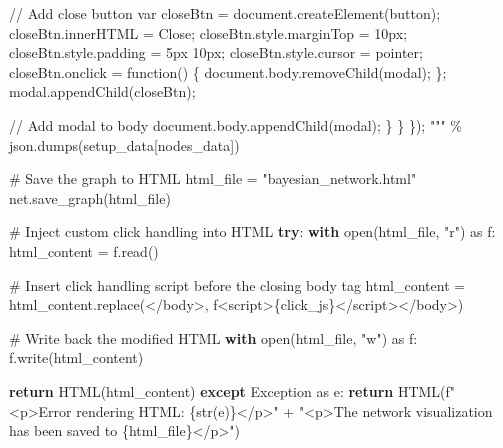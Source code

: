 \documentclass[
  11pt,
  letterpaper,
]{book}
\newenvironment{Shaded}{\begin{snugshade}}{\end{snugshade}}
\newcommand{\BuiltInTok}[1]{\textcolor[rgb]{0.00,0.23,0.31}{#1}}
\newcommand{\CommentTok}[1]{\textcolor[rgb]{0.37,0.37,0.37}{#1}}
\newcommand{\ControlFlowTok}[1]{\textcolor[rgb]{0.00,0.23,0.31}{\textbf{#1}}}
\newcommand{\ImportTok}[1]{\textcolor[rgb]{0.00,0.46,0.62}{#1}}
\newcommand{\NormalTok}[1]{\textcolor[rgb]{0.00,0.23,0.31}{#1}}
\newcommand{\OperatorTok}[1]{\textcolor[rgb]{0.37,0.37,0.37}{#1}}
\newcommand{\PreprocessorTok}[1]{\textcolor[rgb]{0.68,0.00,0.00}{#1}}
\newcommand{\SpecialCharTok}[1]{\textcolor[rgb]{0.37,0.37,0.37}{#1}}
\newcommand{\SpecialStringTok}[1]{\textcolor[rgb]{0.13,0.47,0.30}{#1}}
\newcommand{\StringTok}[1]{\textcolor[rgb]{0.13,0.47,0.30}{#1}}
\begin{document}
\begin{landscape}
\begin{Shaded}
\begin{Highlighting}[]
\StringTok{                // Add close button}
\StringTok{                var closeBtn = document.createElement(\textquotesingle{}button\textquotesingle{});}
\StringTok{                closeBtn.innerHTML = \textquotesingle{}Close\textquotesingle{};}
\StringTok{                closeBtn.style.marginTop = \textquotesingle{}10px\textquotesingle{};}
\StringTok{                closeBtn.style.padding = \textquotesingle{}5px 10px\textquotesingle{};}
\StringTok{                closeBtn.style.cursor = \textquotesingle{}pointer\textquotesingle{};}
\StringTok{                closeBtn.onclick = function() \{}
\StringTok{                    document.body.removeChild(modal);}
\StringTok{                \};}
\StringTok{                modal.appendChild(closeBtn);}

\StringTok{                // Add modal to body}
\StringTok{                document.body.appendChild(modal);}
\StringTok{            \}}
\StringTok{        \}}
\StringTok{    \});}
\StringTok{    """} \OperatorTok{\%}\NormalTok{ json.dumps(setup\_data[}\StringTok{\textquotesingle{}nodes\_data\textquotesingle{}}\NormalTok{])}

    \CommentTok{\# Save the graph to HTML}
\NormalTok{    html\_file }\OperatorTok{=} \StringTok{"bayesian\_network.html"}
\NormalTok{    net.save\_graph(html\_file)}

    \CommentTok{\# Inject custom click handling into HTML}
    \ControlFlowTok{try}\NormalTok{:}
        \ControlFlowTok{with} \BuiltInTok{open}\NormalTok{(html\_file, }\StringTok{"r"}\NormalTok{) }\ImportTok{as}\NormalTok{ f:}
\NormalTok{            html\_content }\OperatorTok{=}\NormalTok{ f.read()}

        \CommentTok{\# Insert click handling script before the closing body tag}
\NormalTok{        html\_content }\OperatorTok{=}\NormalTok{ html\_content.replace(}\StringTok{\textquotesingle{}\textless{}/body\textgreater{}\textquotesingle{}}\NormalTok{, }\SpecialStringTok{f\textquotesingle{}\textless{}script\textgreater{}}\SpecialCharTok{\{}\NormalTok{click\_js}\SpecialCharTok{\}}\SpecialStringTok{\textless{}/script\textgreater{}\textless{}/body\textgreater{}\textquotesingle{}}\NormalTok{)}

        \CommentTok{\# Write back the modified HTML}
        \ControlFlowTok{with} \BuiltInTok{open}\NormalTok{(html\_file, }\StringTok{"w"}\NormalTok{) }\ImportTok{as}\NormalTok{ f:}
\NormalTok{            f.write(html\_content)}

        \ControlFlowTok{return}\NormalTok{ HTML(html\_content)}
    \ControlFlowTok{except} \PreprocessorTok{Exception} \ImportTok{as}\NormalTok{ e:}
        \ControlFlowTok{return}\NormalTok{ HTML(}\SpecialStringTok{f"\textless{}p\textgreater{}Error rendering HTML: }\SpecialCharTok{\{}\BuiltInTok{str}\NormalTok{(e)}\SpecialCharTok{\}}\SpecialStringTok{\textless{}/p\textgreater{}"}
        \OperatorTok{+} \StringTok{"\textless{}p\textgreater{}The network visualization has been saved to \textquotesingle{}}\SpecialCharTok{\{html\_file\}}\StringTok{\textquotesingle{}\textless{}/p\textgreater{}"}\NormalTok{)}
\end{Highlighting}
\end{Shaded}


\end{landscape}
\end{document}

